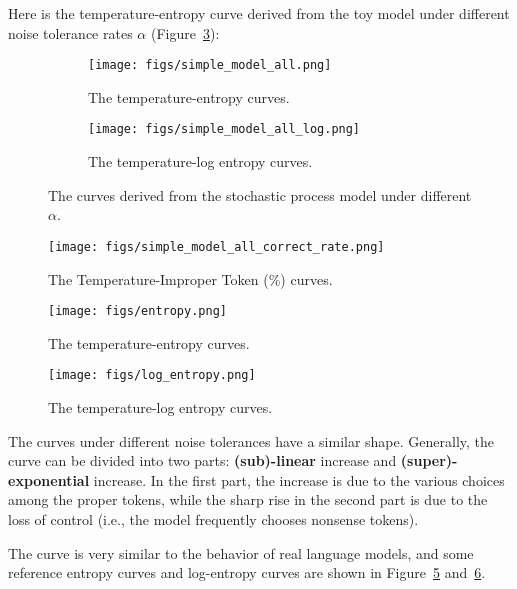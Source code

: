 Here is the temperature-entropy curve derived from the toy model under different noise tolerance rates $\alpha$ (Figure~\ref{fig:toy_curves}):
\begin{figure}[ht]
    \centering
    \begin{subfigure}
        \centering
        \texttt{[image: figs/simple\_model\_all.png]}
        \caption{The temperature-entropy curves.}
        \label{fig:first_image}
    \end{subfigure}
    \begin{subfigure}
        \centering
        \texttt{[image: figs/simple\_model\_all\_log.png]}
        \caption{The temperature-log entropy curves.}
        \label{fig:second_image}
    \end{subfigure}
    \caption{The curves derived from the stochastic process model under different $\alpha$.}
    \label{fig:toy_curves}
\end{figure}
\begin{figure}[ht]
    \vspace{-3mm}
    \centering
    \texttt{[image: figs/simple\_model\_all\_correct\_rate.png]}
    \caption{The Temperature-Improper Token (\%) curves.}
    \label{fig:correct rate}
\end{figure}
\begin{figure}[ht]
\vspace{-3mm}
\centering
\texttt{[image: figs/entropy.png]}
\vspace{-3mm}
\caption{The temperature-entropy curves.}
\label{fig:curves}
\end{figure}
\begin{figure}[h!]
\vspace{-3mm}
\centering
\texttt{[image: figs/log\_entropy.png]}
\vspace{-3mm}
\caption{The temperature-log entropy curves.}
\label{fig:real_curves}
\vspace{-3mm}
\end{figure}
The curves under different noise tolerances have a similar shape. Generally, the curve can be divided into two parts: \textbf{(sub)-linear} increase and \textbf{(super)-exponential} increase. In the first part, the increase is due to the various choices among the proper tokens, while the sharp rise in the second part is due to the loss of control (i.e., the model frequently chooses nonsense tokens).

The curve is very similar to the behavior of real language models, and some reference entropy curves and log-entropy curves are shown in Figure~\ref{fig:curves} and~\ref{fig:real_curves}.

